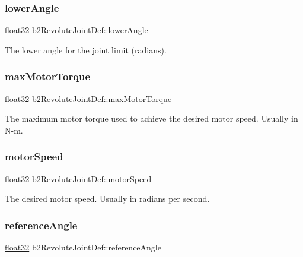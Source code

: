 \subsubsection{\texorpdfstring{lowerAngle}{lowerAngle}}
{\footnotesize\ttfamily \mbox{\hyperlink{b2_settings_8h_aacdc525d6f7bddb3ae95d5c311bd06a1}{float32}} b2\+Revolute\+Joint\+Def\+::lower\+Angle}



The lower angle for the joint limit (radians). 

\mbox{\label{structb2_revolute_joint_def_a9fc1b67fe6d1bc31f88cc2cfd681fe30}} 
\subsubsection{\texorpdfstring{maxMotorTorque}{maxMotorTorque}}
{\footnotesize\ttfamily \mbox{\hyperlink{b2_settings_8h_aacdc525d6f7bddb3ae95d5c311bd06a1}{float32}} b2\+Revolute\+Joint\+Def\+::max\+Motor\+Torque}

The maximum motor torque used to achieve the desired motor speed. Usually in N-\/m. \mbox{\label{structb2_revolute_joint_def_aced7cf768f4dcc3561576a39c7b92ec4}} 
\subsubsection{\texorpdfstring{motorSpeed}{motorSpeed}}
{\footnotesize\ttfamily \mbox{\hyperlink{b2_settings_8h_aacdc525d6f7bddb3ae95d5c311bd06a1}{float32}} b2\+Revolute\+Joint\+Def\+::motor\+Speed}



The desired motor speed. Usually in radians per second. 

\mbox{\label{structb2_revolute_joint_def_a1858d897d5fea04c5e606a1ff73f64f8}} 
\subsubsection{\texorpdfstring{referenceAngle}{referenceAngle}}
{\footnotesize\ttfamily \mbox{\hyperlink{b2_settings_8h_aacdc525d6f7bddb3ae95d5c311bd06a1}{float32}} b2\+Revolute\+Joint\+Def\+::reference\+Angle}



